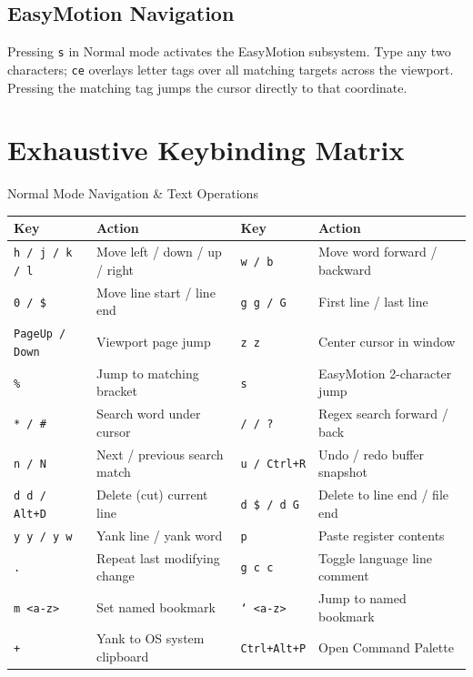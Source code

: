 \documentclass[11pt,a4paper,openany]{book}
\newcommand{\code}[1]{\colorbox{inlinebg}{\texttt{#1}}}
\begin{document}
\section{EasyMotion Navigation}
Pressing \code{s} in Normal mode activates the EasyMotion subsystem. Type any two characters; \texttt{ce} overlays letter tags over all matching targets across the viewport. Pressing the matching tag jumps the cursor directly to that coordinate.

\chapter{Exhaustive Keybinding Matrix}

\begin{keybox}{Normal Mode Navigation \& Text Operations}
\begin{tabularx}{\textwidth}{l X l X}
\toprule
\textbf{Key} & \textbf{Action} & \textbf{Key} & \textbf{Action} \\
\midrule
\code{h / j / k / l} & Move left / down / up / right & \code{w / b} & Move word forward / backward \\
\code{0 / \$} & Move line start / line end & \code{g g / G} & First line / last line \\
\code{PageUp / Down} & Viewport page jump & \code{z z} & Center cursor in window \\
\code{\%} & Jump to matching bracket & \code{s} & EasyMotion 2-character jump \\
\code{* / \#} & Search word under cursor & \code{/ / ?} & Regex search forward / back \\
\code{n / N} & Next / previous search match & \code{u / Ctrl+R} & Undo / redo buffer snapshot \\
\code{d d / Alt+D} & Delete (cut) current line & \code{d \$ / d G} & Delete to line end / file end \\
\code{y y / y w} & Yank line / yank word & \code{p} & Paste register contents \\
\code{.} & Repeat last modifying change & \code{g c c} & Toggle language line comment \\
\code{m <a-z>} & Set named bookmark & \code{` <a-z>} & Jump to named bookmark \\
\code{+} & Yank to OS system clipboard & \code{Ctrl+Alt+P} & Open Command Palette \\
\bottomrule
\end{tabularx}
\end{keybox}
\end{document}
